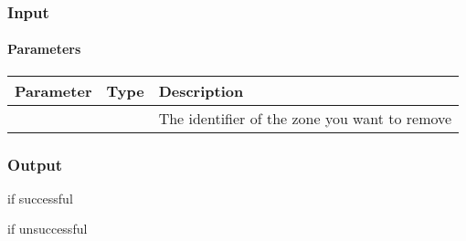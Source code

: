 \documentclass[letterpaper,10pt,english]{sphinxmanual}
\begin{document}
\subsubsection{Input}
\label{\detokenize{docs/Developer/removeZone:input}}
\begin{sphinxVerbatim}[commandchars=\\\{\}]
     
\end{sphinxVerbatim}


\paragraph{Parameters}
\label{\detokenize{docs/Developer/removeZone:parameters}}

\begin{savenotes}\sphinxattablestart
\centering
\begin{tabulary}{\linewidth}[t]{|T|T|T|}
\hline
\sphinxstyletheadfamily 
Parameter
&\sphinxstyletheadfamily 
Type
&\sphinxstyletheadfamily 
Description
\\
\hline
{}
&
&
The identifier of the zone you want to remove
\\
\hline
\end{tabulary}
\par
\sphinxattableend\end{savenotes}


\subsubsection{Output}
\label{\detokenize{docs/Developer/removeZone:output}}
 if successful

 if unsuccessful



\renewcommand{\indexname}{Index}
\printindex
\end{document}

